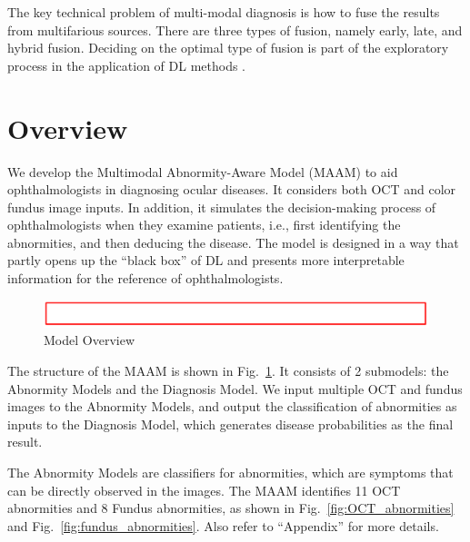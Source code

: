 \documentclass{article}
\begin{document}
	The key technical problem of multi-modal diagnosis is how to fuse the results from multifarious sources. There are three types of fusion, namely early, late, and hybrid fusion. Deciding on the optimal type of fusion is part of the exploratory process in the application of DL methods \autocite{Ichhpujani_Thakur_2021}.
	
	
	
	\section{Overview}
	
	We develop the Multimodal Abnormity-Aware Model (MAAM) to aid ophthalmologists in diagnosing ocular diseases. It considers both OCT and color fundus image inputs. In addition, it simulates the decision-making process of ophthalmologists when they examine patients, i.e., first identifying the abnormities, and then deducing the disease. The model is designed in a way that partly opens up the ``black box'' of DL and presents more interpretable information for the reference of ophthalmologists. 
	
	\begin{figure}[htbp]
		\centering
		\includegraphics[width=\linewidth]{Figs/Temp.png}
		\caption{Model Overview}
		\vspace{0.3cm}
		\label{fig:3_parts}
	\end{figure}
	
	The structure of the MAAM is shown in Fig.~\ref{fig:3_parts}. It consists of 2 submodels: the Abnormity Models and the Diagnosis Model. We input multiple OCT and fundus images to the Abnormity Models, and output the classification of abnormities as inputs to the Diagnosis Model, which generates disease probabilities as the final result.
	
	\vspace{0.5cm}
	
	The Abnormity Models are classifiers for abnormities, which are symptoms that can be directly observed in the images. The MAAM identifies 11 OCT abnormities and 8 Fundus abnormities, as shown in Fig.~\ref{fig:OCT_abnormities} and Fig.~\ref{fig:fundus_abnormities}. Also refer to ``Appendix'' for more details.
	
\end{document}
